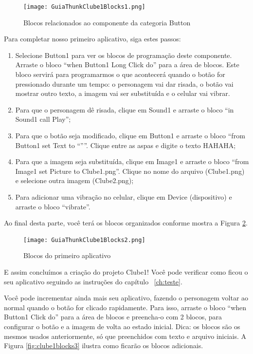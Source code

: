 \documentclass[11pt,fleqn]{book} %
\begin{document}
\begin{figure}[H]
	\centering
    \texttt{[image: GuiaThunkClube1Blocks1.png]}
    \label{fig:clube1blocks1}
    \caption{Blocos relacionados ao componente da categoria Button}
\end{figure}

Para completar nosso primeiro aplicativo, siga estes passos:

\begin{enumerate}

	\item Selecione Button1 para ver os blocos de programação deste componente. Arraste o bloco ``when Button1 Long Click do'' para a área de blocos. Este bloco servirá para programarmos o que acontecerá quando o botão for pressionado durante um tempo:  o personagem vai dar risada, o botão vai mostrar outro texto, a imagem vai ser substituída e o celular vai vibrar.
	\item Para que o personagem dê risada, clique em Sound1 e arraste o bloco ``in Sound1 call Play'';
	\item Para que o botão seja modificado, clique em Button1 e arraste o bloco ``from Button1 set Text to ``''''. Clique entre as aspas e digite o texto HAHAHA;
	\item Para que a imagem seja substituída, clique em Image1 e arraste o bloco ``from Image1 set Picture to Clube1.png''. Clique no nome do arquivo (Clube1.png) e selecione outra imagem (Clube2.png);
	\item Para adicionar uma vibração no celular, clique em Device (dispositivo) e arraste o bloco ``vibrate''.


\end{enumerate}

Ao final desta parte, você terá os blocos organizados conforme mostra a Figura \ref{fig:clube1blocks2}.

\begin{figure}[H]
	\centering
    \texttt{[image: GuiaThunkClube1Blocks2.png]}
     \caption{Blocos do primeiro aplicativo}\label{fig:clube1blocks2}
   
\end{figure}


E assim concluímos a criação do projeto Clube1! Você pode verificar como ficou o seu aplicativo seguindo as instruções do capítulo ~\ref{ch:teste}.

Você pode incrementar ainda mais seu aplicativo, fazendo o personagem voltar ao normal quando o botão for clicado rapidamente. Para isso, arraste o bloco ``when Button1 Click do'' para a área de blocos e preencha-o com 2 blocos, para configurar o botão e a imagem de volta ao estado inicial. Dica: os blocos são os mesmos usados anteriormente, só que preenchidos com texto e arquivo iniciais. A Figura \ref{fig:clube1blocks3} ilustra como ficarão os blocos adicionais.
\end{document}
